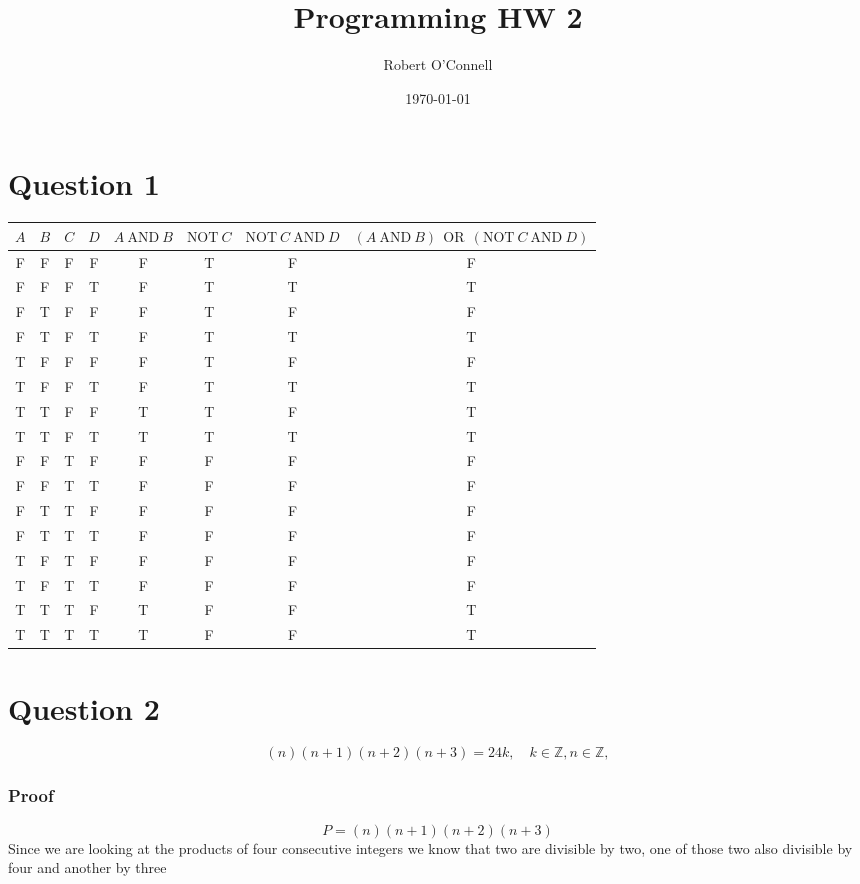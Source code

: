 \documentclass{article}
\title{\textbf{Programming HW 2}}
\author{Robert O'Connell}
\date{\today}
\begin{document}
\maketitle

\section*{Question 1}
\begin{center}
\begin{tabular}{|c|c|c|c|c|c|c|c|}
\hline
$A$ & $B$ & $C$ & $D$ & $A \ \text{AND} \ B$ & $\text{NOT} \ C$ & $\text{NOT} \ C \ \text{AND} \ D$ & $(A \ \text{AND} \ B)\ \  \text{OR}\ \ (\text{NOT} \ C \ \text{AND} \ D)$ \\ \hline
F & F & F & F & F  & T  & F  &  F  \\ \hline
F & F & F & T & F  & T  & T  & T  \\ \hline
F & T & F & F &  F & T  & F  &  F \\ \hline
F & T & F & T &  F & T  & T  &  T \\ \hline
T & F & F & F & F  & T  & F  &  F \\ \hline
T & F & F & T &  F & T  & T  &  T \\ \hline
T & T & F & F &  T & T  & F  & T  \\ \hline
T & T & F & T &  T & T  & T  & T  \\ \hline
F & F & T & F &  F & F  & F  &  F \\ \hline
F & F & T & T &  F & F  & F  & F  \\ \hline
F & T & T & F &  F & F  & F  & F  \\ \hline
F & T & T & T &  F & F  & F  & F  \\ \hline
T & F & T & F & F  & F  & F  & F  \\ \hline
T & F & T & T & F  &  F & F  & F  \\ \hline
T & T & T & F &  T & F  &  F & T  \\ \hline
T & T & T & T &  T & F  & F  & T  \\ \hline
\end{tabular}
\end{center}


\section*{Question 2}
\[
(n)(n+1)(n+2)(n+3) = 24k, \quad k \in \mathbb{Z}, n \in \mathbb{Z}, 
\]
\subsubsection*{Proof}
\[
P = (n)(n+1)(n+2)(n+3)
\]
Since we are looking at the products of four consecutive integers we know that two are divisible by two, one of those two also divisible by four 
and another by three
\end{document}
